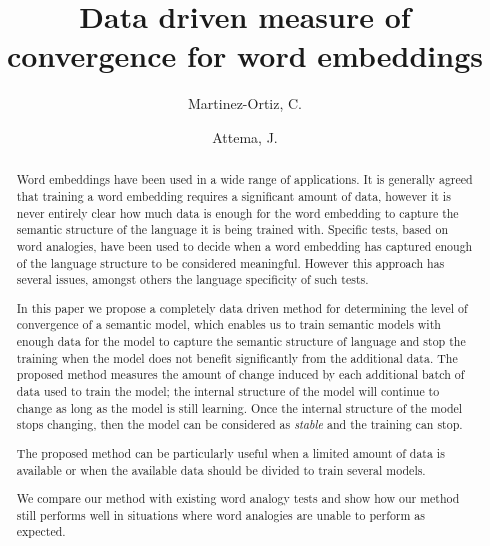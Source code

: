 \documentclass{article} %
\begin{document}
\title{Data driven measure of convergence for word embeddings}
\author{
  Martinez-Ortiz, C.
  \and
  Attema, J.
}

\maketitle

\begin{abstract}
Word embeddings have been used in a wide range of applications. It is generally agreed that training a word embedding requires a significant amount of data, however it is never entirely clear how much data is enough for the word embedding to capture the semantic structure of the language it is being trained with. Specific tests, based on word analogies, have been used to decide when a word embedding has captured enough of the language structure to be considered meaningful. However this approach has several issues, amongst others the language specificity of such tests.

In this paper we propose a completely data driven method for determining the level of convergence of a semantic model, which enables us to train semantic models with enough data for the model to capture the semantic structure of language and stop the training when the model does not benefit significantly from the additional data. The proposed method measures the amount of change induced by each additional batch of data used to train the model; the internal structure of the model will continue to change as long as the model is still learning. Once the internal structure of the model stops changing, then the model can be considered as \textit{stable} and the training can stop.

The proposed method can be particularly useful when a limited amount of data is available or when the available data should be divided to train several models.

We compare our method with existing word analogy tests and show how our method still performs well in situations where word analogies are unable to perform as expected.
\end{abstract}
\end{document}

